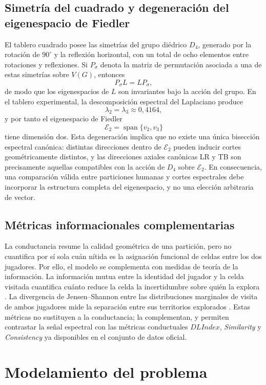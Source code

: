 \documentclass[journal]{IEEEtran}
\newcommand{\Etwo}{\mathcal{E}_2}
\begin{document}
\subsection{Simetría del cuadrado y degeneración del eigenespacio de Fiedler}

El tablero cuadrado posee las simetrías del grupo diédrico $D_4$, generado por la rotación de $90^\circ$ y la reflexión horizontal, con un total de ocho elementos entre rotaciones y reflexiones. Si $P_\sigma$ denota la matriz de permutación asociada a una de estas simetrías sobre $V(G)$, entonces
\[
P_\sigma L = L P_\sigma,
\]
de modo que los eigenespacios de $L$ son invariantes bajo la acción del grupo. En el tablero experimental, la descomposición espectral del Laplaciano produce
\[
\lambda_2 = \lambda_3 \approx 0{,}4164,
\]
y por tanto el eigenespacio de Fiedler
\[
\Etwo = \operatorname{span}\{v_2, v_3\}
\]
tiene dimensión dos. Esta degeneración implica que no existe una única bisección espectral canónica: distintas direcciones dentro de $\Etwo$ pueden inducir cortes geométricamente distintos, y las direcciones axiales canónicas LR y TB son precisamente aquellas compatibles con la acción de $D_4$ sobre $\Etwo$. En consecuencia, una comparación válida entre particiones humanas y cortes espectrales debe incorporar la estructura completa del eigenespacio, y no una elección arbitraria de vector.

\subsection{Métricas informacionales complementarias}

La conductancia resume la calidad geométrica de una partición, pero no cuantifica por sí sola cuán nítida es la asignación funcional de celdas entre los dos jugadores. Por ello, el modelo se complementa con medidas de teoría de la información. La información mutua entre la identidad del jugador y la celda visitada cuantifica cuánto reduce la celda la incertidumbre sobre quién la explora \cite{cover2006}. La divergencia de Jensen--Shannon entre las distribuciones marginales de visita de ambos jugadores mide la separación entre sus territorios explorados \cite{lin1991}. Estas métricas no sustituyen a la conductancia; la complementan, y permiten contrastar la señal espectral con las métricas conductuales $DLIndex$, \emph{Similarity} y \emph{Consistency} ya disponibles en el conjunto de datos oficial.

\section{Modelamiento del problema}
\end{document}
